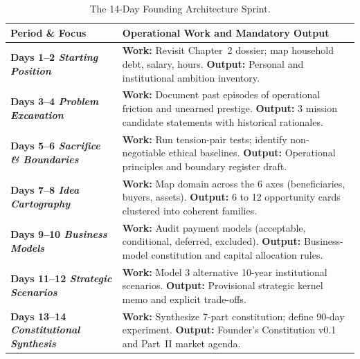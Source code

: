 \begin{table}[htbp]
\centering
\begin{tcolorbox}[
  enhanced,
  colback=white,
  colframe=BayesBorder!80!white,
  boxrule=0.4pt,
  arc=2pt,
  left=3pt,right=3pt,top=3pt,bottom=3pt,
  before skip=3pt,after skip=4pt
]
\scriptsize
\setlength{\tabcolsep}{3pt}
\renewcommand{\arraystretch}{1.18}
\begin{tabularx}{\linewidth}{@{} >{\bfseries\color{BayesInk}}p{2.2cm} >{\color{BayesInk}}X @{}}
\toprule
\textbf{Period \& Focus} & \textbf{Operational Work and Mandatory Output} \\
\midrule
Days 1--2\newline
\textit{Starting Position} & 
\textbf{Work:} Revisit Chapter~2 dossier; map household debt, salary, hours.\newline
\textbf{Output:} Personal and institutional ambition inventory. \\
\midrule
Days 3--4\newline
\textit{Problem Excavation} & 
\textbf{Work:} Document past episodes of operational friction and unearned prestige.\newline
\textbf{Output:} 3 mission candidate statements with historical rationales. \\
\midrule
Days 5--6\newline
\textit{Sacrifice \& Boundaries} & 
\textbf{Work:} Run tension-pair tests; identify non-negotiable ethical baselines.\newline
\textbf{Output:} Operational principles and boundary register draft. \\
\midrule
Days 7--8\newline
\textit{Idea Cartography} & 
\textbf{Work:} Map domain across the 6 axes (beneficiaries, buyers, assets).\newline
\textbf{Output:} 6 to 12 opportunity cards clustered into coherent families. \\
\midrule
Days 9--10\newline
\textit{Business Models} & 
\textbf{Work:} Audit payment models (acceptable, conditional, deferred, excluded).\newline
\textbf{Output:} Business-model constitution and capital allocation rules. \\
\midrule
Days 11--12\newline
\textit{Strategic Scenarios} & 
\textbf{Work:} Model 3 alternative 10-year institutional scenarios.\newline
\textbf{Output:} Provisional strategic kernel memo and explicit trade-offs. \\
\midrule
Days 13--14\newline
\textit{Constitutional Synthesis} & 
\textbf{Work:} Synthesize 7-part constitution; define 90-day experiment.\newline
\textbf{Output:} Founder's Constitution v0.1 and Part~II market agenda. \\
\bottomrule
\end{tabularx}
\end{tcolorbox}
\caption{The 14-Day Founding Architecture Sprint.}
\label{tab:founding-process}
\end{table}


